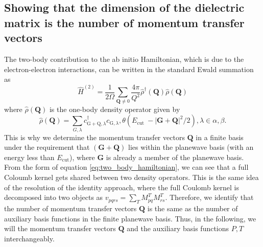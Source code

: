 \subsection{Showing that the dimension of the dielectric matrix is the number of momentum transfer vectors }
The two-body contribution to the ab initio Hamiltonian, which is due to the electron-electron interactions, can be written in the standard Ewald summation as 
\begin{equation}
\hat{H}^{(2)}=\frac{1}{2 \Omega} \sum_{\mathbf{Q} \neq 0} \frac{4 \pi}{Q^2} \hat{\rho}^{\dagger}(\mathbf{Q}) \hat{\rho}(\mathbf{Q})
\label{eq:two_body_hamiltonian}
\end{equation}
where 
$\hat{\rho}(\mathbf{Q})$ is the one-body density operator given by
\begin{equation}
\hat{\rho}(\mathbf{Q}) = \sum_{G , \lambda} c_{\mathrm{G}+\mathrm{Q}, \lambda}^{\dagger} c_{\mathrm{G}, \lambda}, \theta\left({E_{\text {cut }}-|\mathbf{G}+\mathbf{Q}|^2 / 2}\right), \lambda \in \alpha ,\beta .
\end{equation}
This is why we determine the momentum transfer vectors $\mathbf{Q}$ in a finite basis under the requirement that $(\bm{G}+\mathbf{Q})$ lies within the planewave basis (with an energy less than $E_{\text{cut}}$), where $\bm{G}$ is already a member of the planewave basis. From the form of equation \ref{eq:two_body_hamiltonian}, we can see that a full Coloumb kernel gets shared between two density operators. This is the same idea of the resolution of the identity approach, where the full Coulomb kernel is decomposed into two objects as $v_{pqrs} = \sum_T M_{pq}^T M_{rs}^T$. Therefore, we identify that the number of momentum transfer vectors $\mathbf{Q}$ is the same as the number of auxiliary basis functions in the finite planewave basis. Thus, in the following, we will the momentum transfer vectors $\bm{Q}$ and the auxiliary basis functions $P,T$ interchangeably.

